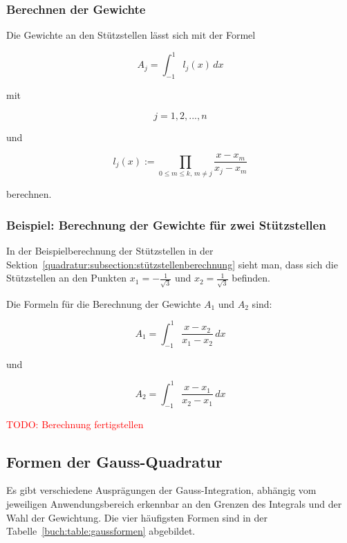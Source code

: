 \subsubsection{Berechnen der Gewichte}
Die Gewichte an den Stützstellen lässt sich mit der Formel

\begin{equation*}
    A_{j} = \int_{-1}^{1} l_j(x) \, dx
\end{equation*}

mit

\begin{equation*}
    j = 1, 2, ... , n
\end{equation*}

und 

\begin{equation}
    l_{j}(x) := \prod_{0 \leq m \leq k, \, m \neq j} \frac{x - x_{m}}{x_{j} - x_{m}}
\end{equation}

berechnen.

\newpage

\subsubsection{Beispiel: Berechnung der Gewichte für zwei Stützstellen}
In der Beispielberechnung der Stützstellen in der 
Sektion~\ref{quadratur:subsection:stützstellenberechnung} sieht man, dass sich die 
Stützstellen an den Punkten $x_{1} = -\frac{1}{\sqrt{3}} $ und $x_{2} = \frac{1}{\sqrt{3}} $ befinden.

Die Formeln für die Berechnung der Gewichte $A_{1}$ und $A_{2}$ sind:

\begin{equation*}
    A_{1} = \int_{-1}^{1} \frac{x - x_{2}}{x_{1} - x_{2}} \, dx
\end{equation*}
    
und

\begin{equation}
    A_{2} = \int_{-1}^{1} \frac{x - x_{1}}{x_{2} - x_{1}} \, dx
\end{equation}

\textcolor{red}{TODO: Berechnung fertigstellen}



\subsection{Formen der Gauss-Quadratur
\label{quadratur:subsection:gaussformen}}
Es gibt verschiedene Ausprägungen der Gauss-Integration, abhängig vom jeweiligen Anwendungsbereich 
erkennbar an den Grenzen des Integrals und der Wahl der Gewichtung.
Die vier häufigsten Formen sind in der Tabelle~\ref{buch:table:gaussformen} abgebildet.

